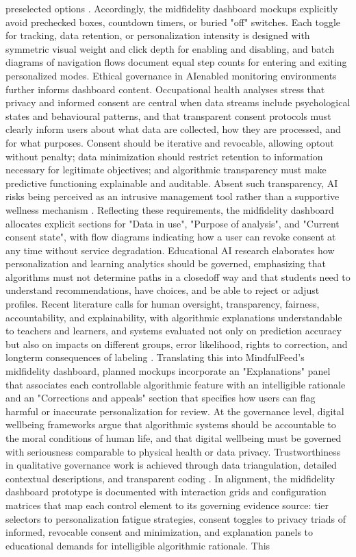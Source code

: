 \documentclass{article}
\begin{document}
preselected options \parencites[2]{4807303}. Accordingly, the mid\-fidelity dashboard mockups explicitly avoid prechecked boxes, countdown timers, or buried "off" switches. Each toggle for tracking, data retention, or personalization intensity is designed with symmetric visual weight and click depth for enabling and disabling, and batch diagrams of navigation flows document equal step counts for entering and exiting personalized modes. Ethical governance in AI\-enabled monitoring environments further informs dashboard content. Occupational health analyses stress that privacy and informed consent are central when data streams include psychological states and behavioural patterns, and that transparent consent protocols must clearly inform users about what data are collected, how they are processed, and for what purposes. Consent should be iterative and revocable, allowing opt\-out without penalty; data minimization should restrict retention to information necessary for legitimate objectives; and algorithmic transparency must make predictive functioning explainable and auditable. Absent such transparency, AI risks being perceived as an intrusive management tool rather than a supportive wellness mechanism \parencites[18]{8760542}. Reflecting these requirements, the mid\-fidelity dashboard allocates explicit sections for "Data in use", "Purpose of analysis", and "Current consent state", with flow diagrams indicating how a user can revoke consent at any time without service degradation. Educational AI research elaborates how personalization and learning analytics should be governed, emphasizing that algorithms must not determine paths in a closed\-off way and that students need to understand recommendations, have choices, and be able to reject or adjust profiles. Recent literature calls for human oversight, transparency, fairness, accountability, and explainability, with algorithmic explanations understandable to teachers and learners, and systems evaluated not only on prediction accuracy but also on impacts on different groups, error likelihood, rights to correction, and long\-term consequences of labeling \parencites[6]{5375614}. Translating this into MindfulFeed's mid\-fidelity dashboard, planned mockups incorporate an "Explanations" panel that associates each controllable algorithmic feature with an intelligible rationale and an "Corrections and appeals" section that specifies how users can flag harmful or inaccurate personalization for review. At the governance level, digital well\-being frameworks argue that algorithmic systems should be accountable to the moral conditions of human life, and that digital well\-being must be governed with seriousness comparable to physical health or data privacy. Trustworthiness in qualitative governance work is achieved through data triangulation, detailed contextual descriptions, and transparent coding \parencites[2]{7808872}[8]{7808872}. In alignment, the mid\-fidelity dashboard prototype is documented with interaction grids and configuration matrices that map each control element to its governing evidence source: tier selectors to personalization fatigue strategies, consent toggles to privacy triads of informed, revocable consent and minimization, and explanation panels to educational demands for intelligible algorithmic rationale. This 
\end{document}
